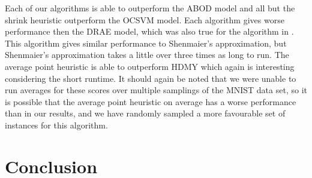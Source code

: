 \documentclass[11pt,twoside]{report}
\theoremstyle{definition}
\numberwithin{theorem}{section}
\numberwithin{definition}{section}
\numberwithin{lemma}{section}
\numberwithin{proposition}{section}
\numberwithin{equation}{section}
\numberwithin{figure}{section}
\begin{document}
Each of our algorithms is able to outperform the ABOD model and all but the shrink heuristic outperform the OCSVM model. Each algorithm gives worse performance then the DRAE model, which was also true for the algorithm in \cite{huding}. This algorithm gives similar performance to Shenmaier's approximation, but Shenmaier's approximation takes a little over three times as long to run. The average point heuristic is able to outperform HDMY which again is interesting considering the short runtime. It should again be noted that we were unable to run averages for these scores over multiple samplings of the MNIST data set, so it is possible that the average point heuristic on average has a worse performance than in our results, and we have randomly sampled a more favourable set of instances for this algorithm.


\chapter{Conclusion}



\clearpage
\end{document}
